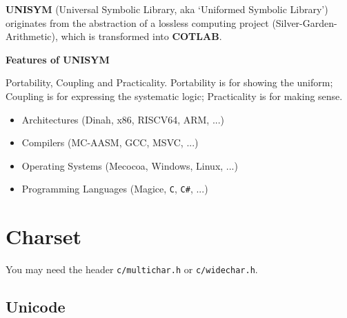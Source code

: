

\textbf{UNISYM} (Universal Symbolic Library, aka `Uniformed Symbolic Library') originates from the abstraction of a lossless computing project (Silver-Garden-Arithmetic), which is transformed into \textbf{COTLAB}.

\textbf{Features of UNISYM}

Portability, Coupling and Practicality. Portability is for showing the uniform; Coupling is for expressing the systematic logic; Practicality is for making sense.

\begin{itemize}
	\item Architectures (Dinah, x86, RISCV64, ARM, ...)
	\item Compilers (MC-AASM, GCC, MSVC, ...)
	\item Operating Systems (Mecocoa, Windows, Linux, ...)
	\item Programming Languages (Magice, \verb|C|, \verb|C#|, ...)
\end{itemize}


\section{Charset}

You may need the header \verb|c/multichar.h| or \verb|c/widechar.h|.

\subsection{Unicode}


